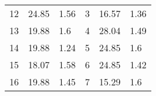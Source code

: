 \documentclass[oneside,onecolumn]{article}
\begin{document}
\begin{table}[]
\begin{tabular}{llllll}
12                                                                                  & 24.85                                                                                                   & 1.56                                                                                   & 3                                                                                    & 16.57                                                                                                   & 1.36                                                                                   \\
13                                                                                  & 19.88                                                                                                   & 1.6                                                                                    & 4                                                                                    & 28.04                                                                                                   & 1.49                                                                                   \\
14                                                                                  & 19.88                                                                                                   & 1.24                                                                                   & 5                                                                                    & 24.85                                                                                                   & 1.6                                                                                    \\
15                                                                                  & 18.07                                                                                                   & 1.58                                                                                   & 6                                                                                    & 24.85                                                                                                   & 1.42                                                                                   \\
16                                                                                  & 19.88                                                                                                   & 1.45                                                                                   & 7                                                                                    & 15.29                                                                                                   & 1.6                                                                                    \\

\end{tabular}
\end{table}
\end{document}
